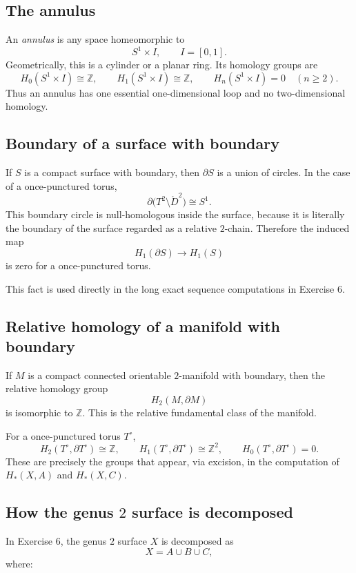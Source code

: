 \documentclass[12pt,a4paper]{article}
\theoremstyle{notespace}
\begin{document}
\subsection{The annulus}

An \emph{annulus} is any space homeomorphic to
\[
S^1\times I,
\qquad I=[0,1].
\]
Geometrically, this is a cylinder or a planar ring. Its homology groups are
\[
H_0(S^1\times I)\cong \mathbb Z,\qquad
H_1(S^1\times I)\cong \mathbb Z,\qquad
H_n(S^1\times I)=0\quad(n\ge 2).
\]
Thus an annulus has one essential one-dimensional loop and no two-dimensional homology.

\subsection{Boundary of a surface with boundary}

If \(S\) is a compact surface with boundary, then \(\partial S\) is a union of circles. In the case of a once-punctured torus,
\[
\partial\bigl(T^2\setminus \mathring{D}^2\bigr)\cong S^1.
\]
This boundary circle is null-homologous inside the surface, because it is literally the boundary of the surface regarded as a relative \(2\)-chain. Therefore the induced map
\[
H_1(\partial S)\to H_1(S)
\]
is zero for a once-punctured torus.

This fact is used directly in the long exact sequence computations in Exercise 6.

\subsection{Relative homology of a manifold with boundary}

If \(M\) is a compact connected orientable \(2\)-manifold with boundary, then the relative homology group
\[
H_2(M,\partial M)
\]
is isomorphic to \(\mathbb Z\). This is the relative fundamental class of the manifold.

For a once-punctured torus \(T^\circ\),
\[
H_2(T^\circ,\partial T^\circ)\cong \mathbb Z,
\qquad
H_1(T^\circ,\partial T^\circ)\cong \mathbb Z^2,
\qquad
H_0(T^\circ,\partial T^\circ)=0.
\]
These are precisely the groups that appear, via excision, in the computation of \(H_*(X,A)\) and \(H_*(X,C)\).

\subsection{How the genus \(2\) surface is decomposed}

In Exercise 6, the genus \(2\) surface \(X\) is decomposed as
\[
X=A\cup B\cup C,
\]
where:
\end{document}
